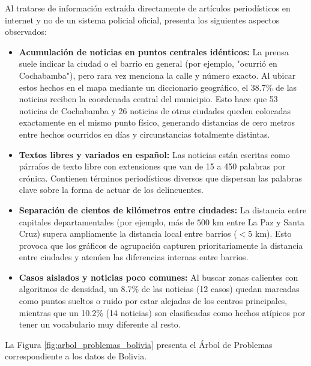 Al tratarse de información extraída directamente de artículos periodísticos en internet y no de un sistema policial oficial, presenta los siguientes aspectos observados:
\begin{itemize}
    \item \textbf{Acumulación de noticias en puntos centrales idénticos:} La prensa suele indicar la ciudad o el barrio en general (por ejemplo, "ocurrió en Cochabamba"), pero rara vez menciona la calle y número exacto. Al ubicar estos hechos en el mapa mediante un diccionario geográfico, el 38.7\% de las noticias reciben la coordenada central del municipio. Esto hace que 53 noticias de Cochabamba y 26 noticias de otras ciudades queden colocadas exactamente en el mismo punto físico, generando distancias de cero metros entre hechos ocurridos en días y circunstancias totalmente distintas.
    \item \textbf{Textos libres y variados en español:} Las noticias están escritas como párrafos de texto libre con extensiones que van de 15 a 450 palabras por crónica. Contienen términos periodísticos diversos que dispersan las palabras clave sobre la forma de actuar de los delincuentes.
    \item \textbf{Separación de cientos de kilómetros entre ciudades:} La distancia entre capitales departamentales (por ejemplo, más de $500\text{ km}$ entre La Paz y Santa Cruz) supera ampliamente la distancia local entre barrios ($<5\text{ km}$). Esto provoca que los gráficos de agrupación capturen prioritariamente la distancia entre ciudades y atenúen las diferencias internas entre barrios.
    \item \textbf{Casos aislados y noticias poco comunes:} Al buscar zonas calientes con algoritmos de densidad, un 8.7\% de las noticias (12 casos) quedan marcadas como puntos sueltos o ruido por estar alejadas de los centros principales, mientras que un 10.2\% (14 noticias) son clasificadas como hechos atípicos por tener un vocabulario muy diferente al resto.
\end{itemize}

La Figura \ref{fig:arbol_problemas_bolivia} presenta el Árbol de Problemas correspondiente a los datos de Bolivia.

